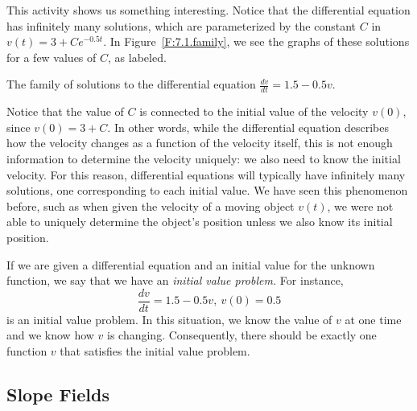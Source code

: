 
This activity shows us something interesting.  Notice that the differential equation has infinitely many solutions, which are parameterized by the constant $C$ in $v(t) = 3+Ce^{-0.5t}$.  In Figure~\ref{F:7.1.family}, we see the graphs of these solutions for a few values of $C$,  as labeled.

\begin{marginfigure}[3cm] %
\caption{The family of solutions to the differential equation $\frac{dv}{dt} = 1.5 - 0.5v$.} \label{F:7.1.family} 
\end{marginfigure}

Notice that the value of $C$ is connected to the initial value of the velocity $v(0)$, since $v(0) = 3+C$.  In other words, while the differential equation describes how the velocity changes as a function of the velocity itself, this is not enough information to determine the velocity uniquely:  we also need to know the initial velocity.  For this reason, differential equations will typically have infinitely many solutions, one corresponding to each initial value.  We have seen this phenomenon before, such as when given the velocity of a moving object $v(t)$, we were not able to uniquely determine the object's position unless we also know its initial position.

If we are given a differential equation and an initial value for the unknown function, we say that we have an {\em initial value problem.} For instance,
$$   \frac{dv}{dt} = 1.5-0.5v, \ v(0) = 0.5 $$
is an initial value problem.  In this situation, we know the value of $v$ at one time and we know how $v$ is changing.  Consequently, there should be exactly one function $v$ that satisfies the initial value problem.

%
%

\subsection{Slope Fields} 

